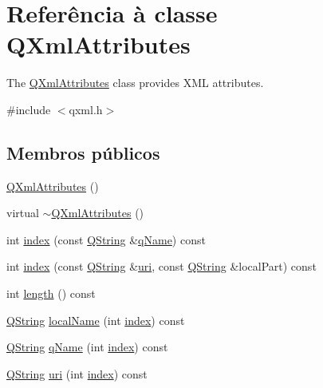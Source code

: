 \hypertarget{class_q_xml_attributes}{\section{Referência à classe Q\-Xml\-Attributes}
\label{class_q_xml_attributes}
}


The \hyperlink{class_q_xml_attributes}{Q\-Xml\-Attributes} class provides X\-M\-L attributes.  




{\ttfamily \#include $<$qxml.\-h$>$}

\subsection*{Membros públicos}
\begin{DoxyCompactItemize}
\item 
\hyperlink{class_q_xml_attributes_a98a082471a64f4769cb92f3b6a27caa8}{Q\-Xml\-Attributes} ()
\item 
virtual \hyperlink{class_q_xml_attributes_a8bc3b19caa0afd52351f7b7666805d46}{$\sim$\-Q\-Xml\-Attributes} ()
\item 
int \hyperlink{class_q_xml_attributes_a864bb4a85182ffbf8d15ce9353b6942b}{index} (const \hyperlink{class_q_string}{Q\-String} \&\hyperlink{class_q_xml_attributes_ab93893ae887eb8ba2513fe3bb35af05b}{q\-Name}) const 
\item 
int \hyperlink{class_q_xml_attributes_ace05e00e5e4ebcec64bd900807c579b1}{index} (const \hyperlink{class_q_string}{Q\-String} \&\hyperlink{class_q_xml_attributes_aaa089f3b1e328f9122b7ffc7ab8788d8}{uri}, const \hyperlink{class_q_string}{Q\-String} \&local\-Part) const 
\item 
int \hyperlink{class_q_xml_attributes_a57b988236ee6a3a5e572d126d3fbccc1}{length} () const 
\item 
\hyperlink{class_q_string}{Q\-String} \hyperlink{class_q_xml_attributes_a59acfa0ed737903c134e1bbb57e3c756}{local\-Name} (int \hyperlink{class_q_xml_attributes_a864bb4a85182ffbf8d15ce9353b6942b}{index}) const 
\item 
\hyperlink{class_q_string}{Q\-String} \hyperlink{class_q_xml_attributes_ab93893ae887eb8ba2513fe3bb35af05b}{q\-Name} (int \hyperlink{class_q_xml_attributes_a864bb4a85182ffbf8d15ce9353b6942b}{index}) const 
\item 
\hyperlink{class_q_string}{Q\-String} \hyperlink{class_q_xml_attributes_aaa089f3b1e328f9122b7ffc7ab8788d8}{uri} (int \hyperlink{class_q_xml_attributes_a864bb4a85182ffbf8d15ce9353b6942b}{index}) const 

\end{DoxyCompactItemize}
